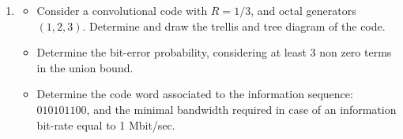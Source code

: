 \documentclass[11pt]{article}
\begin{document}
\begin{enumerate}




\item
\begin{itemize}
\item  Consider a convolutional code with $R=1/3$, and octal generators $(1,2,3)$. Determine and draw the trellis and tree diagram of the code. 
\item Determine the bit-error probability, considering at least 3 non zero terms in the union bound.
\item Determine the code word associated to the information sequence: $010101100$, and the minimal bandwidth required in case of an information bit-rate equal to 1 Mbit/sec.\\
\end{itemize}

\end{enumerate}
\end{document}
